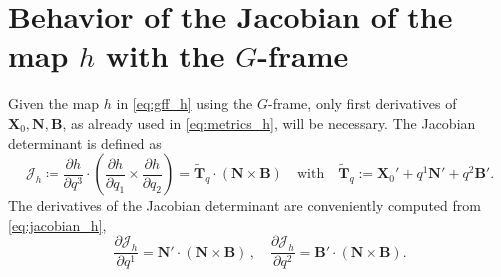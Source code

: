 \documentclass[12pt]{iopart}
\newcommand\hlchangedrev[1]{#1} %
\newcommand\ddp[2]{\frac{\partial #1}{\partial #2}}
\newcommand\X{{\bm{X}}_0}
\newcommand\Nnew{{\bm N}}
\newcommand\Bnew{{\bm B}}
\newcommand\hmap{{h}}
\newcommand\GFF{$G$-frame}
\newcommand\ttilde{{\tilde{\bm T}_q}}
\newcommand{\Jh}{\mathcal{J}_h}
\begin{document}
%
\appendix
\section{\hlchangedrev{Behavior of the Jacobian of the map $\hmap$ with the \GFF{} }\label{app:jacobian}}
\hlchangedrev{Given the map $\hmap$ in \eqref{eq:gff_h} using the \GFF{}, only first derivatives of $\X,\Nnew,\Bnew$, as already used in \eqref{eq:metrics_h}, will be necessary.
The Jacobian determinant is defined as
\begin{equation}
  \Jh \coloneqq \ddp{h}{q^3}\cdot\left(\ddp{h}{q_1}\times\ddp{h}{q_2} \right)=\ttilde\cdot(\Nnew\times \Bnew) \quad \text{with}\quad \ttilde:= \X'+q^1 \Nnew' +q^2 \Bnew'. \label{eq:jacobian_h}
\end{equation}
The derivatives of the Jacobian determinant are conveniently computed from \eqref{eq:jacobian_h}, 
\begin{equation}
    \ddp{\Jh}{q^1}= \Nnew'\cdot(\Nnew\times \Bnew)\,,\quad  \ddp{\Jh}{q^2}= \Bnew'\cdot(\Nnew\times \Bnew). \label{eq:jacobian_h_dq}
\end{equation}
}%
\end{document}
